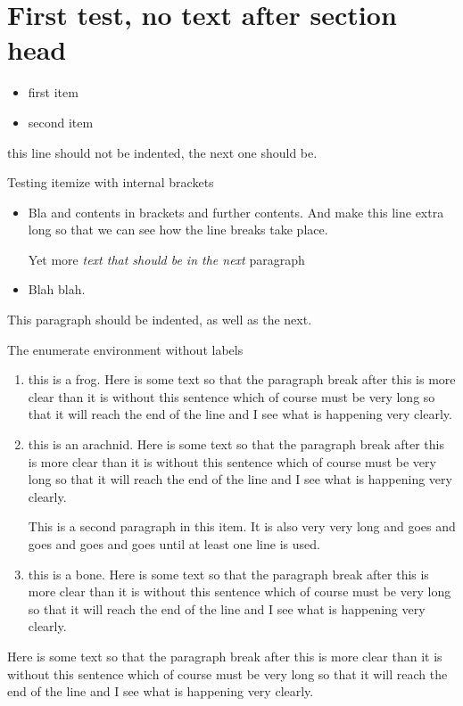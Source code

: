 \documentclass{article}
\begin{document}
\section{First test, no text after section head}
\begin{itemize}
\item first item
\item second item
\end{itemize}
this line should not be indented, the next one should be.

Testing itemize with internal brackets
\begin{itemize}
\item Bla {and contents in brackets} and further contents.  And make this 
line extra long so that we can see how the line breaks take place.

Yet more {\it text that should be in the next} paragraph
\item Blah blah.
\end{itemize}

This paragraph should be indented, as well as the next.

The enumerate environment without labels
\begin{enumerate}
\item this is a frog. Here is some text so that the paragraph break after this
is more clear than it is without this sentence which of
course must be very long so that it will reach the end of
the line and I see what is happening very clearly.
\item this is an arachnid. Here is some text so that the paragraph break after this
is more clear than it is without this sentence which of
course must be very long so that it will reach the end of
the line and I see what is happening very clearly.

This is a second paragraph in this item.  It is also
very very long and goes and goes and goes and goes until
at least one line is used.

\item this is a bone. Here is some text so that the paragraph break after this
is more clear than it is without this sentence which of
course must be very long so that it will reach the end of
the line and I see what is happening very clearly.
\end{enumerate}
Here is some text so that the paragraph break after this
is more clear than it is without this sentence which of
course must be very long so that it will reach the end of
the line and I see what is happening very clearly.
\end{document}
